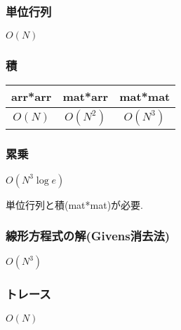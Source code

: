 \documentclass[9pt,twocolumn,a4paper,landscape]{extarticle}
\begin{document}
\subsubsection{単位行列}
$O(N)$ \par


\subsubsection{積}
\begin{table}[htb]
  \begin{tabular}{|c|c|c|} \hline
    arr*arr & mat*arr & mat*mat \\ \hline
    $O(N)$ & $O(N^2)$ & $O(N^3)$\\ \hline
  \end{tabular}
\end{table}


\subsubsection{累乗}
$O(N^3 \log e)$\par
単位行列と積(mat*mat)が必要.\par


\subsubsection{線形方程式の解(Givens消去法)}
$O(N^3)$


\subsubsection{トレース}
$O(N)$

\end{document}
